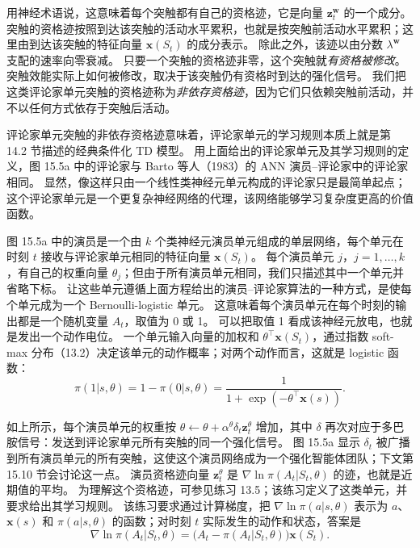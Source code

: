 \documentclass[UTF8, 12pt, fontset=fandol, oneside]{ctexart}
\begin{document}
用神经术语说，这意味着每个突触都有自己的资格迹，它是向量 $\mathbf{z}_t^{\mathbf{w}}$ 的一个成分。
突触的资格迹按照到达该突触的活动水平累积，也就是按突触前活动水平累积；这里由到达该突触的特征向量 $\mathbf{x}(S_t)$ 的成分表示。
除此之外，该迹以由分数 $\lambda^{\mathbf{w}}$ 支配的速率向零衰减。
只要一个突触的资格迹非零，这个突触就\emph{有资格被修改}。
突触效能实际上如何被修改，取决于该突触仍有资格时到达的强化信号。
我们把这类评论家单元突触的资格迹称为\emph{非依存资格迹}，因为它们只依赖突触前活动，并不以任何方式依存于突触后活动。

评论家单元突触的非依存资格迹意味着，评论家单元的学习规则本质上就是第 14.2 节描述的经典条件化 TD 模型。
用上面给出的评论家单元及其学习规则的定义，图 15.5a 中的评论家与 Barto 等人（1983）的 ANN 演员--评论家中的评论家相同。
显然，像这样只由一个线性类神经元单元构成的评论家只是最简单起点；这个评论家单元是一个更复杂神经网络的代理，该网络能够学习复杂度更高的价值函数。

图 15.5a 中的演员是一个由 $k$ 个类神经元演员单元组成的单层网络，每个单元在时刻 $t$ 接收与评论家单元相同的特征向量 $\mathbf{x}(S_t)$。
每个演员单元 $j$，$j=1,\ldots,k$，有自己的权重向量 $\theta_j$；但由于所有演员单元相同，我们只描述其中一个单元并省略下标。
让这些单元遵循上面方程给出的演员--评论家算法的一种方式，是使每个单元成为一个 Bernoulli-logistic 单元。
这意味着每个演员单元在每个时刻的输出都是一个随机变量 $A_t$，取值为 0 或 1。
可以把取值 1 看成该神经元放电，也就是发出一个动作电位。
一个单元输入向量的加权和 $\theta^\top\mathbf{x}(S_t)$，通过指数 soft-max 分布（13.2）决定该单元的动作概率；对两个动作而言，这就是 logistic 函数：
\begin{equation}
\pi(1|s,\theta)=1-\pi(0|s,\theta)=\frac{1}{1+\exp(-\theta^\top\mathbf{x}(s))}.
\tag{15.2}
\end{equation}

如上所示，每个演员单元的权重按 $\theta\leftarrow\theta+\alpha^\theta\delta_t\mathbf{z}_t^\theta$ 增加，其中 $\delta$ 再次对应于多巴胺信号：发送到评论家单元所有突触的同一个强化信号。
图 15.5a 显示 $\delta_t$ 被广播到所有演员单元的所有突触，这使这个演员网络成为一个强化智能体团队；下文第 15.10 节会讨论这一点。
演员资格迹向量 $\mathbf{z}_t^\theta$ 是 $\nabla\ln\pi(A_t|S_t,\theta)$ 的迹，也就是近期值的平均。
为理解这个资格迹，可参见练习 13.5；该练习定义了这类单元，并要求给出其学习规则。
该练习要求通过计算梯度，把 $\nabla\ln\pi(a|s,\theta)$ 表示为 $a$、$\mathbf{x}(s)$ 和 $\pi(a|s,\theta)$ 的函数；对时刻 $t$ 实际发生的动作和状态，答案是
\begin{equation}
\nabla\ln\pi(A_t|S_t,\theta)=\big(A_t-\pi(A_t|S_t,\theta)\big)\mathbf{x}(S_t).
\tag{15.3}
\end{equation}
\end{document}
